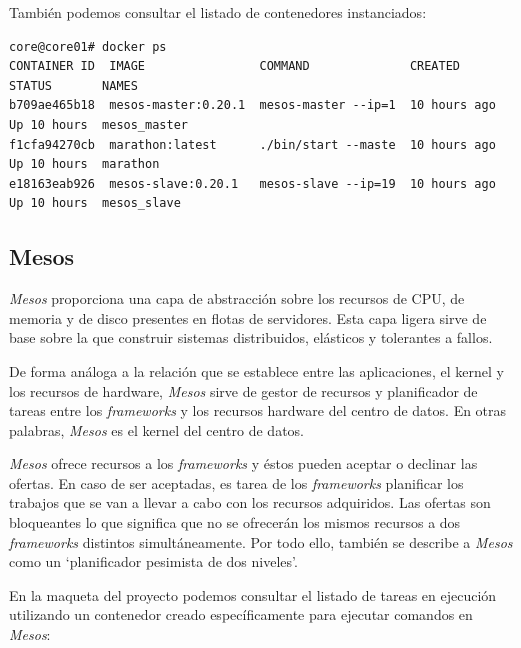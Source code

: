 \documentclass[a4paper,12pt,spanish,final]{epsc_tfc_pfc}
\begin{document}
También podemos consultar el listado de contenedores instanciados:\\

\begin{lstlisting}[style=dnsmasq]
core@core01# docker ps
CONTAINER ID  IMAGE                COMMAND              CREATED        STATUS       NAMES
b709ae465b18  mesos-master:0.20.1  mesos-master --ip=1  10 hours ago   Up 10 hours  mesos_master
f1cfa94270cb  marathon:latest      ./bin/start --maste  10 hours ago   Up 10 hours  marathon
e18163eab926  mesos-slave:0.20.1   mesos-slave --ip=19  10 hours ago   Up 10 hours  mesos_slave
\end{lstlisting}

\subsection{Mesos}

\emph{Mesos} proporciona una capa de abstracción sobre los recursos de CPU, de memoria y de disco presentes en flotas de servidores. Esta capa ligera sirve de base sobre la que construir sistemas distribuidos, elásticos y tolerantes a fallos.

De forma análoga a la relación que se establece entre las aplicaciones, el kernel y los recursos de hardware, \emph{Mesos} sirve de gestor de recursos y planificador de tareas entre los \emph{frameworks} y los recursos hardware del centro de datos. En otras palabras, \emph{Mesos} es el kernel del centro de datos.

\emph{Mesos} ofrece recursos a los \emph{frameworks} y éstos pueden aceptar o declinar las ofertas. En caso de ser aceptadas, es tarea de los \emph{frameworks} planificar los trabajos que se van a llevar a cabo con los recursos adquiridos. Las ofertas son bloqueantes lo que significa que no se ofrecerán los mismos recursos a dos \emph{frameworks} distintos simultáneamente. Por todo ello, también se describe a \emph{Mesos} como un `planificador pesimista de dos niveles'.

En la maqueta del proyecto podemos consultar el listado de tareas en ejecución utilizando un contenedor creado específicamente para ejecutar comandos en \emph{Mesos}:\\
\end{document}
